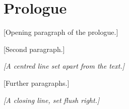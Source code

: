 \clearpage
\chapter*{Prologue}


\begingroup
\setlength{\parindent}{0pt}
\setlength{\parskip}{0.9em}
\linespread{1.08}\selectfont

[Opening paragraph of the prologue.]

[Second paragraph.]

\begin{center}
	\emph{[A centred line set apart from the text.]}
\end{center}

[Further paragraphs.]

\begin{flushright}
	\emph{[A closing line, set flush right.]}
\end{flushright}

\endgroup
